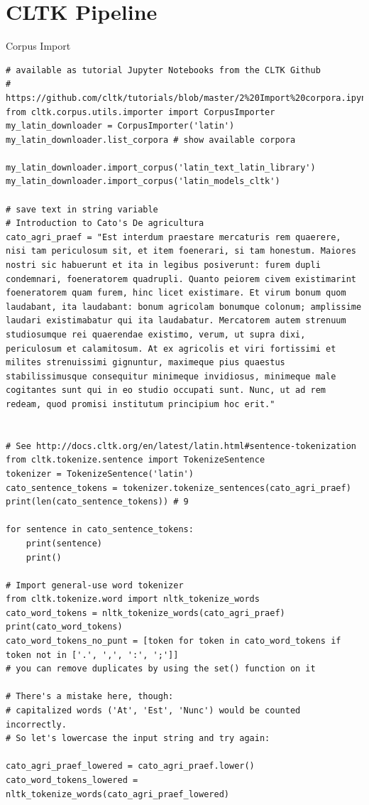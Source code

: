 \documentclass[10pt]{beamer}
\begin{document}
\section{CLTK Pipeline}
\begin{frame}{Corpus Import} 
\begin{verbatim}
# available as tutorial Jupyter Notebooks from the CLTK Github
# https://github.com/cltk/tutorials/blob/master/2%20Import%20corpora.ipynb
from cltk.corpus.utils.importer import CorpusImporter
my_latin_downloader = CorpusImporter('latin')
my_latin_downloader.list_corpora # show available corpora

my_latin_downloader.import_corpus('latin_text_latin_library')
my_latin_downloader.import_corpus('latin_models_cltk')

# save text in string variable
# Introduction to Cato's De agricultura
cato_agri_praef = "Est interdum praestare mercaturis rem quaerere, nisi tam periculosum sit, et item foenerari, si tam honestum. Maiores nostri sic habuerunt et ita in legibus posiverunt: furem dupli condemnari, foeneratorem quadrupli. Quanto peiorem civem existimarint foeneratorem quam furem, hinc licet existimare. Et virum bonum quom laudabant, ita laudabant: bonum agricolam bonumque colonum; amplissime laudari existimabatur qui ita laudabatur. Mercatorem autem strenuum studiosumque rei quaerendae existimo, verum, ut supra dixi, periculosum et calamitosum. At ex agricolis et viri fortissimi et milites strenuissimi gignuntur, maximeque pius quaestus stabilissimusque consequitur minimeque invidiosus, minimeque male cogitantes sunt qui in eo studio occupati sunt. Nunc, ut ad rem redeam, quod promisi institutum principium hoc erit."


# See http://docs.cltk.org/en/latest/latin.html#sentence-tokenization
from cltk.tokenize.sentence import TokenizeSentence
tokenizer = TokenizeSentence('latin')
cato_sentence_tokens = tokenizer.tokenize_sentences(cato_agri_praef)
print(len(cato_sentence_tokens)) # 9

for sentence in cato_sentence_tokens:
    print(sentence)
    print()

# Import general-use word tokenizer
from cltk.tokenize.word import nltk_tokenize_words
cato_word_tokens = nltk_tokenize_words(cato_agri_praef)
print(cato_word_tokens)
cato_word_tokens_no_punt = [token for token in cato_word_tokens if token not in ['.', ',', ':', ';']]
# you can remove duplicates by using the set() function on it

# There's a mistake here, though:
# capitalized words ('At', 'Est', 'Nunc') would be counted incorrectly.
# So let's lowercase the input string and try again:

cato_agri_praef_lowered = cato_agri_praef.lower()
cato_word_tokens_lowered = nltk_tokenize_words(cato_agri_praef_lowered)
\end{verbatim}
\end{frame}
\end{document}
